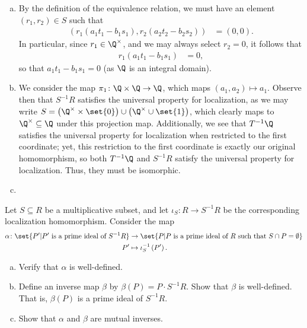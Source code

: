 \documentclass[10pt]{mypackage}
\begin{document}
\begin{solution}\hfill
  \begin{enumerate}[(a)]
    \item By the definition of the equivalence relation, we must have an element $\left( r_1,r_2 \right)\in S$ such that
      \begin{align*}
        \left( r_1\left( a_1t_1-b_1s_1 \right),r_2\left( a_2t_2-b_2s_2 \right) \right) &= \left( 0,0 \right).
      \end{align*}
      In particular, since $r_1\in \Q^{\times}$, and we may always select $r_2 = 0$, it follows that
      \begin{align*}
        r_1\left( a_1t_1-b_1s_1 \right) &= 0,
      \end{align*}
      so that $a_1t_1 - b_1s_1 = 0$ (as $\Q$ is an integral domain).
    \item We consider the map $\pi_1\colon \Q\times \Q\rightarrow \Q$, which maps $\left( a_1,a_2 \right)\mapsto a_1$. Observe then that $S^{-1}R$ satisfies the universal property for localization, as we may write $S = \left( \Q^{\times}\times \set{0} \right)\cup \left( \Q^{\times}\cup \set{1} \right)$, which clearly maps to $\Q^{\times}\subseteq \Q$ under this projection map. Additionally, we see that $T^{-1}\Q$ satisfies the universal property for localization when restricted to the first coordinate; yet, this restriction to the first coordinate is exactly our original homomorphism, so both $T^{-1}\Q$ and $S^{-1}R$ satisfy the universal property for localization. Thus, they must be isomorphic.
    \item 
  \end{enumerate}
\end{solution}
\begin{problem}[Problem 7]
  Let $S\subseteq R$ be a multiplicative subset, and let $\iota_S\colon R\rightarrow S^{-1}R$ be the corresponding localization homomorphism. Consider the map
  \begin{align*}
    \alpha\colon \set{P'| P'\text{ is a prime ideal of }S^{-1}R}&\rightarrow \set{P | P\text{ is a prime ideal of }R\text{ such that }S\cap P = \emptyset}\\
    P'&\mapsto \iota_S^{-1}\left( P' \right).
  \end{align*}
  \begin{enumerate}[(a)]
    \item Verify that $\alpha$ is well-defined.
    \item Define an inverse map $\beta$ by $\beta(P) = P\cdot S^{-1}R$. Show that $\beta$ is well-defined. That is, $\beta(P)$ is a prime ideal of $S^{-1}R$.
    \item Show that $\alpha$ and $\beta$ are mutual inverses.
  \end{enumerate}
\end{problem}
\end{document}
